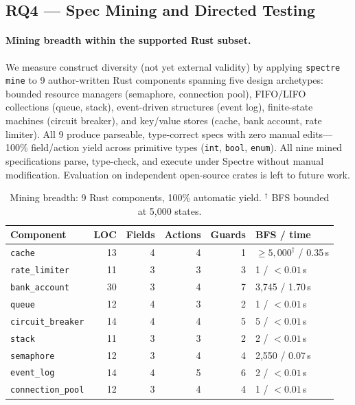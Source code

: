 \documentclass[runningheads]{../paper-vmcai-2027/llncs}
\begin{document}
\subsection{RQ4 --- Spec Mining and Directed Testing}\label{sec:eval:external}

\paragraph{Mining breadth within the supported Rust subset.}
We measure construct diversity (not yet external validity) by applying
\texttt{spectre mine} to 9 author-written Rust components spanning five
design archetypes: bounded resource managers (semaphore, connection pool),
FIFO/LIFO collections (queue, stack), event-driven structures (event log),
finite-state machines (circuit breaker), and key/value stores (cache, bank
account, rate limiter).
All 9 produce parseable, type-correct specs with zero manual edits---100\%
field/action yield across primitive types (\texttt{int}, \texttt{bool}, \texttt{enum}).
All nine mined specifications parse, type-check, and execute under Spectre
without manual modification.
Evaluation on independent open-source crates is left to future work.

\begin{table}[t]
\caption{Mining breadth: 9 Rust components, 100\% automatic yield.
  $^\dagger$ BFS bounded at 5{,}000 states.}\label{tab:external}
\centering\small
\begin{tabular}{lrrrrl}
\toprule
Component & LOC & Fields & Actions & Guards & BFS / time \\
\midrule
\texttt{cache}            & 13 & 4 & 4 & 1  & ${\geq}5{,}000^\dagger$ / 0.35\,s \\
\texttt{rate\_limiter}    & 11 & 3 & 3 & 3  & 1 / ${<}0.01$\,s \\
\texttt{bank\_account}    & 30 & 3 & 4 & 7  & 3{,}745 / 1.70\,s \\
\texttt{queue}            & 12 & 4 & 3 & 2  & 1 / ${<}0.01$\,s \\
\texttt{circuit\_breaker} & 14 & 4 & 4 & 5  & 5 / ${<}0.01$\,s \\
\texttt{stack}            & 11 & 3 & 3 & 2  & 2 / ${<}0.01$\,s \\
\texttt{semaphore}        & 12 & 3 & 4 & 4  & 2{,}550 / 0.07\,s \\
\texttt{event\_log}       & 14 & 4 & 5 & 6  & 2 / ${<}0.01$\,s \\
\texttt{connection\_pool} & 12 & 3 & 4 & 4  & 1 / ${<}0.01$\,s \\
\bottomrule
\end{tabular}
\end{table}
\end{document}
